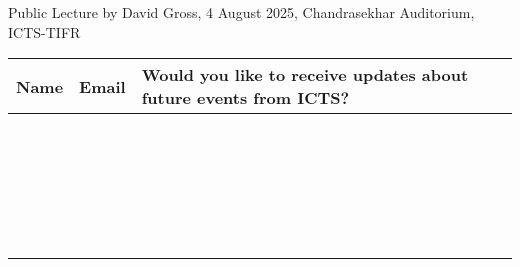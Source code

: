 \documentclass[a4paper]{article}
\begin{document}
Public Lecture by David Gross, 4 August 2025, Chandrasekhar Auditorium, ICTS-TIFR

\begin{center}
    \begin{tabular}{ m{7cm} | m{9cm} | m{3cm} }
     Name & Email & Would you like to receive updates about future events from ICTS? \\
     \hline 
      & & \\
      \hline 
      & & \\
      \hline 
      & & \\
      \hline 
      & & \\
      \hline 
      & & \\
      \hline 
      & & \\
      \hline 
      & & \\
      \hline 
      & & \\
      \hline 
      & & \\
      \hline 
      & & \\
      \hline 
      & & \\
      \hline 
      & & \\ 
      \hline 
      & & \\ 
      \hline 
      & & \\ 
      \hline 
      & & \\ 
      \hline 
      & & \\  
      \hline 
      & & \\ 
      \hline 
      & & \\ 
      \hline 
      & & \\ 
      \hline 
      & & \\ 
      \hline 
      & & \\ 
      \hline 
      & & \\ 
      \hline 
      & & \\ 
      & &     
    \end{tabular}
    \end{center}
\end{document}
